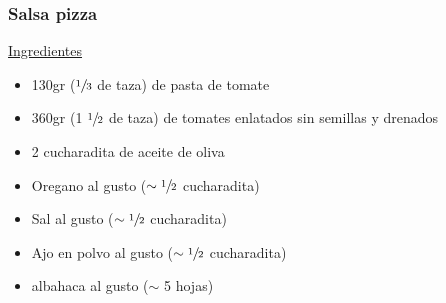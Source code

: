 \subsubsection{Salsa pizza}

\underline{Ingredientes}

\begin{itemize}
\item 130gr ($\sfrac{1}{3}$ de taza) de pasta de tomate
\item 360gr  (1 $\sfrac{1}{2}$ de taza) de tomates enlatados sin semillas y drenados
\item 2 cucharadita de aceite de oliva
\item Oregano al gusto ($\sim\sfrac{1}{2}$ cucharadita)
\item Sal al gusto ($\sim\sfrac{1}{2}$ cucharadita)
\item Ajo en polvo al gusto ($\sim\sfrac{1}{2}$ cucharadita)
\item albahaca al gusto ($\sim$ 5 hojas)
\end{itemize}

